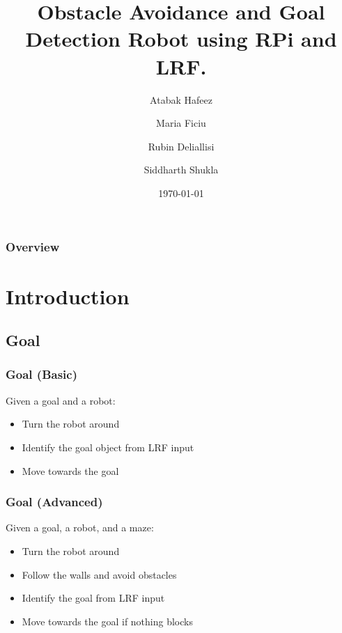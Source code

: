 \documentclass{beamer}
\title[Design Phase]{Obstacle Avoidance and Goal Detection Robot using RPi and LRF.} %
\author{Atabak Hafeez \and
Maria Ficiu \and
Rubin Deliallisi \and
Siddharth Shukla} %
\institute[Jacobs University Bremen] %
{
Jacobs University Bremen \\ %
\medskip
}
\date{\today} %
\begin{document}
\begin{frame}
\titlepage %
\end{frame}

\begin{frame}
\frametitle{Overview} %
\tableofcontents %
\end{frame}



\section{Introduction}

\subsection{Goal}
\begin{frame}
\frametitle{Goal (Basic)}
Given a goal and a robot:
\begin{itemize}
\item Turn the robot around
\item Identify the goal object from LRF input
\item Move towards the goal
\end{itemize}

\end{frame}
\begin{frame}
\frametitle{Goal (Advanced)}
Given a goal, a robot, and a maze:
\begin{itemize}
\item Turn the robot around
\item Follow the walls and avoid obstacles
\item Identify the goal from LRF input
\item Move towards the goal if nothing blocks
\end{itemize}
\end{frame}
\end{document}
